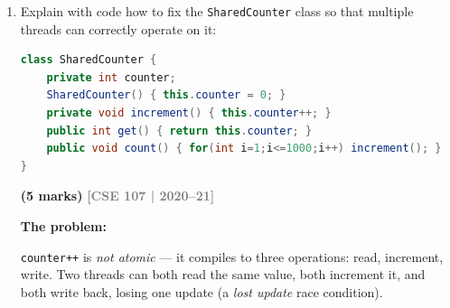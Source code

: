 \documentclass[12pt,a3paper]{article}
\newcommand{\yr}[1]{\hfill\textcolor{gray}{\small\textbf{[#1]}}}
\newcommand{\mk}[1]{\textcolor{orange!70!black}{\small\textbf{(#1 marks)}}}
\begin{document}
\begin{enumerate}
\begin{tcolorbox}[enhanced,breakable,ansbox,
  colback=cF!4,colframe=cF,boxrule=0.8pt,arc=5pt,
  title={\textbf{Answer --- Two Threads via Lambda (No Subclassing)}},
  fonttitle=\bfseries\color{white},colbacktitle=cF]
\begin{lstlisting}[language=Java]
        // Thread for f2() -- static method, no object needed
        Thread t2 = new Thread(TestClass::f2, "T2");

        t1.start();
        t2.start();

        t1.join();
        t2.join();

        System.out.println("Both threads finished.");
    }
}
\end{lstlisting}

\textbf{Why this satisfies all constraints:}
\begin{itemize}[itemsep=2pt]
  \item \texttt{TestClass} is not modified.
  \item No new class extends or implements anything ---
    \texttt{() -> obj.f1()} is an anonymous lambda that the compiler
    treats as a \texttt{Runnable} without requiring an explicit
    \texttt{implements Runnable} declaration.
  \item Two separate threads (\texttt{t1} for \texttt{f1()},
    \texttt{t2} for \texttt{f2()}) are created and run concurrently.
\end{itemize}

\end{tcolorbox}

\item Explain with code how to fix the \texttt{SharedCounter} class so that multiple threads can correctly operate on it:
\begin{lstlisting}[language=Java]
class SharedCounter {
    private int counter;
    SharedCounter() { this.counter = 0; }
    private void increment() { this.counter++; }
    public int get() { return this.counter; }
    public void count() { for(int i=1;i<=1000;i++) increment(); }
}
\end{lstlisting}
\mk{5}
\yr{CSE 107 | 2020--21}

\begin{tcolorbox}[enhanced,breakable,ansbox,
  colback=cF!4,colframe=cF,boxrule=0.8pt,arc=5pt,
  title={\textbf{Answer --- Fixing \texttt{SharedCounter} for Thread Safety}},
  fonttitle=\bfseries\color{white},colbacktitle=cF]

\textbf{The problem:}

\texttt{counter++} is \emph{not atomic} --- it compiles to three
operations: read, increment, write.  Two threads can both read the
same value, both increment it, and both write back, losing one
update (a \emph{lost update} race condition).


\end{tcolorbox}
\end{enumerate}
\end{document}
